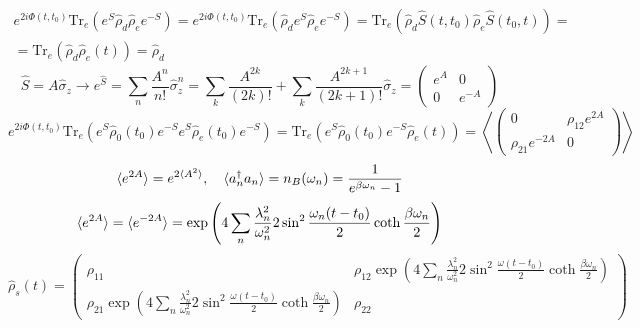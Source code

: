 \documentclass[12pt]{article}
\theoremstyle{definition}
\begin{document}
\begin{enumerate}
\begin{equation}
    \end{equation}
    \begin{multline}
        e^{2i\Phi(t,t_0)}\text{Tr}_e(e^S\hat{\rho}_d\hat{\rho}_ee^{-S})=e^{2i\Phi(t,t_0)}\text{Tr}_e(\hat{\rho}_de^S\hat{\rho}_ee^{-S})=\text{Tr}_e(\hat{\rho}_d\hat{S}(t,t_0)\hat{\rho}_e\hat{S}(t_0,t))=\\=\text{Tr}_e(\hat{\rho}_d\hat{\rho}_e(t))=\hat{\rho}_d
    \end{multline}
    \begin{equation}
        \hat{S}=A\hat{\sigma}_z\rightarrow e^{\hat{S}}=\sum\limits_n\frac{A^n}{n!}\hat{\sigma}^n_z=\sum\limits_k\frac{A^{2k}}{(2k)!}+\sum\limits_k\frac{A^{2k+1}}{(2k+1)!}\hat{\sigma}_z=\begin{pmatrix}
        e^A & 0\\
        0 & e^{-A}
        \end{pmatrix}
    \end{equation}
    \begin{equation*}
        e^{2i\Phi(t,t_0)}\text{Tr}_e(e^S\hat{\rho}_0(t_0)e^{-S}e^S\hat{\rho}_e(t_0)e^{-S})=\text{Tr}_e(e^S\hat{\rho}_0(t_0)e^{-S}\hat{\rho}_e(t))=\left<\begin{pmatrix}
        0 & \rho_{12}e^{2A}\\
        \rho_{21}e^{-2A} & 0
        \end{pmatrix}\right>
    \end{equation*}
    \begin{equation}
        \braket{e^{2A}}=e^{2\braket{A^2}},\quad\braket{a^\dagger_na_n}=n_B(\omega_n)=\frac{1}{e^{\beta\omega_n}-1}
    \end{equation}
    \begin{equation}
        \braket{e^{2A}}=\braket{e^{-2A}}=\exp\left(4\sum\limits_n\frac{\lambda^2_n}{\omega^2_n}2\sin^2\frac{\omega_n(t-t_0)}{2}\coth\frac{\beta\omega_n}{2}\right)
    \end{equation}
    \begin{equation*}
        \boxed{\hat{\rho}_s(t)=\begin{pmatrix}
        \rho_{11} & \rho_{12}\exp\left(4\sum\limits_n\frac{\lambda^2_n}{\omega^2_n}2\sin^2\frac{\omega(t-t_0)}{2}\coth\frac{\beta\omega_n}{2}\right)\\
        \rho_{21}\exp\left(4\sum\limits_n\frac{\lambda^2_n}{\omega^2_n}2\sin^2\frac{\omega(t-t_0)}{2}\coth\frac{\beta\omega_n}{2}\right) & \rho_{22}
        \end{pmatrix}}
    \end{equation*}

\end{enumerate}
\end{document}
